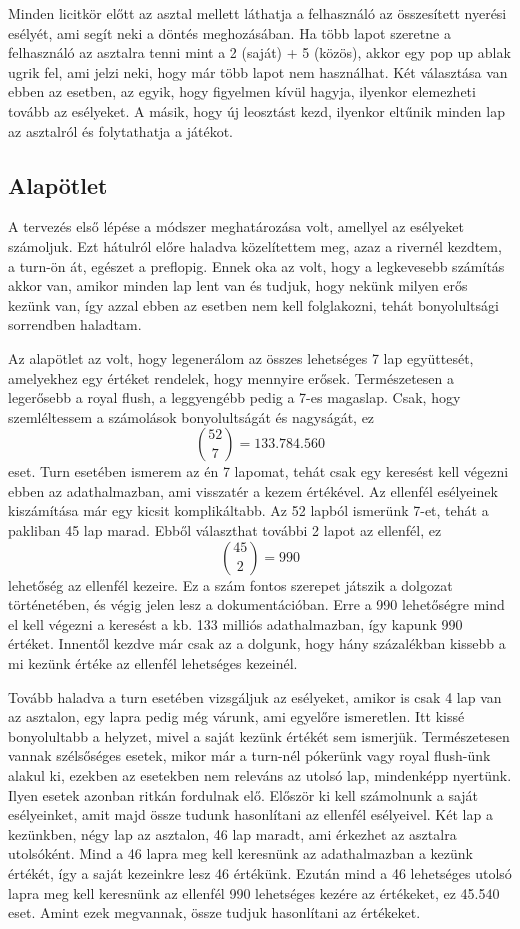 Minden licitkör előtt az asztal mellett láthatja a felhasználó az összesített nyerési esélyét, ami segít neki a döntés meghozásában. Ha több lapot szeretne a felhasználó az asztalra tenni mint a 2 (saját) + 5 (közös), akkor egy pop up ablak ugrik fel, ami jelzi neki, hogy már több lapot nem használhat. Két választása van ebben az esetben, az egyik, hogy figyelmen kívül hagyja, ilyenkor elemezheti tovább az esélyeket. A másik, hogy új leosztást kezd, ilyenkor eltűnik minden lap az asztalról és folytathatja a játékot.

\subsection{Alapötlet}
A tervezés első lépése a módszer meghatározása volt, amellyel az esélyeket számoljuk. Ezt hátulról előre haladva közelítettem meg, azaz a rivernél kezdtem, a turn-ön át, egészet a preflopig. Ennek oka az volt, hogy a legkevesebb számítás akkor van, amikor minden lap lent van és tudjuk, hogy nekünk milyen erős kezünk van, így azzal ebben az esetben nem kell folglakozni, tehát bonyolultsági sorrendben haladtam.

Az alapötlet az volt, hogy legenerálom az összes lehetséges 7 lap együttesét, amelyekhez egy értéket rendelek, hogy mennyire erősek. Természetesen a legerősebb a royal flush, a leggyengébb pedig a 7-es magaslap. Csak, hogy szemléltessem a számolások bonyolultságát és nagyságát, ez \[ \binom{52}{7}=133.784.560\] eset. Turn esetében ismerem az én 7 lapomat, tehát csak egy keresést kell végezni ebben az adathalmazban, ami visszatér a kezem értékével. Az ellenfél esélyeinek kiszámítása már egy kicsit komplikáltabb. Az 52 lapból ismerünk 7-et, tehát a pakliban 45 lap marad. Ebből választhat további 2 lapot az ellenfél, ez \[ \binom{45}{2}=990\] lehetőség az ellenfél kezeire. Ez a szám fontos szerepet játszik a dolgozat történetében, és végig jelen lesz a dokumentációban. Erre a 990 lehetőségre mind el kell végezni a keresést a kb. 133 milliós adathalmazban, így kapunk 990 értéket. Innentől kezdve már csak az a dolgunk, hogy hány százalékban kissebb a mi kezünk értéke az ellenfél lehetséges kezeinél. 

Tovább haladva a turn esetében vizsgáljuk az esélyeket, amikor is csak 4 lap van az asztalon, egy lapra pedig még várunk, ami egyelőre ismeretlen. Itt kissé bonyolultabb a helyzet, mivel a saját kezünk értékét sem ismerjük. Természetesen vannak szélsőséges esetek, mikor már a turn-nél pókerünk vagy royal flush-ünk alakul ki, ezekben az esetekben nem releváns az utolsó lap, mindenképp nyertünk. Ilyen esetek azonban ritkán fordulnak elő. Először ki kell számolnunk a saját esélyeinket, amit majd össze tudunk hasonlítani az ellenfél esélyeivel. Két lap a kezünkben, négy lap az asztalon, 46 lap maradt, ami érkezhet az asztalra utolsóként. Mind a 46 lapra meg kell keresnünk az adathalmazban a kezünk értékét, így a saját kezeinkre lesz 46 értékünk. Ezután mind a 46 lehetséges utolsó lapra meg kell keresnünk az ellenfél 990 lehetséges kezére az értékeket, ez 45.540 eset. Amint ezek megvannak, össze tudjuk hasonlítani az értékeket.

